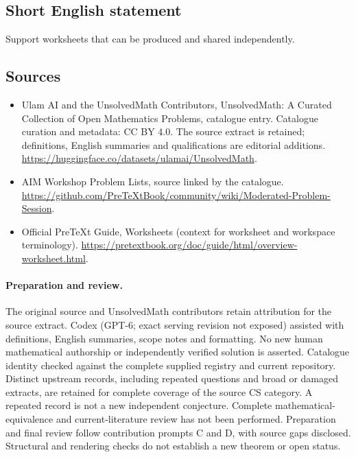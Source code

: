 \documentclass[11pt]{article}
\begin{document}
\subsection{Short English statement}
Support worksheets that can be produced and shared independently.
\subsection{Sources}
\begin{itemize}
\item[\hypertarget{source:statement:1}{S1}] Ulam AI and the UnsolvedMath Contributors, UnsolvedMath: A Curated Collection of Open Mathematics Problems, catalogue entry. Catalogue curation and metadata: CC BY 4.0. The source extract is retained; definitions, English summaries and qualifications are editorial additions.
\url{https://huggingface.co/datasets/ulamai/UnsolvedMath}.
\item[\hypertarget{source:statement:2}{S2}] AIM Workshop Problem Lists, source linked by the catalogue.
\url{https://github.com/PreTeXtBook/community/wiki/Moderated-Problem-Session}.
\item[\hypertarget{source:statement:3}{S3}] Official PreTeXt Guide, Worksheets (context for worksheet and workspace terminology).
\url{https://pretextbook.org/doc/guide/html/overview-worksheet.html}.
\end{itemize}
\paragraph{Preparation and review.}
The original source and UnsolvedMath contributors retain attribution for the source extract. Codex (GPT-6; exact serving revision not exposed) assisted with definitions, English summaries, scope notes and formatting. No new human mathematical authorship or independently verified solution is asserted. Catalogue identity checked against the complete supplied registry and current repository. Distinct upstream records, including repeated questions and broad or damaged extracts, are retained for complete coverage of the source CS category. A repeated record is not a new independent conjecture. Complete mathematical-equivalence and current-literature review has not been performed. Preparation and final review follow contribution prompts C and D, with source gaps disclosed. Structural and rendering checks do not establish a new theorem or open status.
\label{end:statement}
\end{document}
